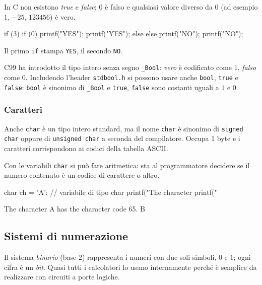 \documentclass[11pt,a4paper]{article}
\begin{document}
In C non esistono \emph{true} e \emph{false}: $0$ è falso e qualsiasi valore
diverso da $0$ (ad esempio $1$, $-25$, $123456$) è vero.

\begin{codice}
if (3)                      if (0)
    printf("YES\n");            printf("YES\n");
else                        else
    printf("NO\n");             printf("NO\n");
\end{codice}

Il primo \lstinline|if| stampa \texttt{YES}, il secondo \texttt{NO}.

C99 ha introdotto il tipo intero senza segno \lstinline|_Bool|: \emph{vero} è
codificato come $1$, \emph{falso} come $0$. Includendo l'header
\lstinline|stdbool.h| si possono usare anche \lstinline|bool|, \lstinline|true| e
\lstinline|false|: \lstinline|bool| è sinonimo di \lstinline|_Bool| e
\lstinline|true|, \lstinline|false| sono costanti uguali a $1$ e $0$.

\subsubsection{Caratteri}

Anche \lstinline|char| è un tipo intero standard, ma il nome \lstinline|char| è
sinonimo di \lstinline|signed char| oppure di \lstinline|unsigned char| a seconda
del compilatore. Occupa 1 byte e i caratteri corrispondono ai codici della
tabella ASCII.

Con le variabili \lstinline|char| si può fare aritmetica: sta al programmatore
decidere se il numero contenuto è un codice di carattere o altro.

\begin{codice}
char ch = 'A';       // variabile di tipo char
printf("The character %
printf("%
\end{codice}
\begin{risultato}
The character A has the character code 65.
B
\end{risultato}

\subsection{Sistemi di numerazione}

\begin{definizione}
Il sistema \emph{binario} (base 2) rappresenta i numeri con due soli simboli,
$0$ e $1$; ogni cifra è un \emph{bit}. Quasi tutti i calcolatori lo usano
internamente perché è semplice da realizzare con circuiti a porte logiche.
\end{definizione}
\end{document}
